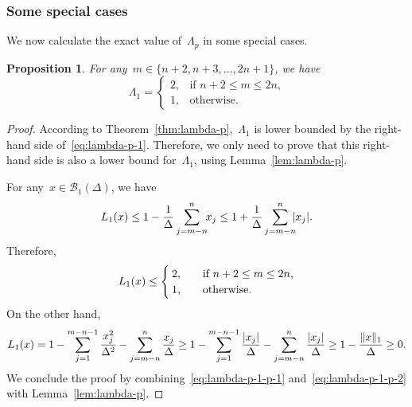 \documentclass{article}
\numberwithin{equation}{section}
\theoremstyle{definition}
\theoremstyle{plain}
\newtheorem{proposition}{Proposition}[section]
\theoremstyle{remark}
\newcommand*{\abs}[2][]{#1\lvert#2#1\rvert}
\newcommand*{\lagp}[1][]{L\ifblank{#1}{}{_{#1}}}
\newcommand*{\norm}[2][]{#1\lVert#2#1\rVert}
\newcommand*{\set}[2][]{#1\{#2#1\}}
\begin{document}
\subsubsection{Some special cases}

We now calculate the exact value of~$\Lambda_p$ in some special cases.

\begin{proposition}
    \label{prop:lambda-p-1}
    For any~$m \in \set{n + 2, n + 3, \dots, 2n + 1}$, we have
    \begin{equation}
        \label{eq:lambda-p-1}
        \Lambda_1 =
        \begin{cases}
            2,  & \text{if~$n + 2 \le m \le 2n$,}\\
            1,  & \text{otherwise.}
        \end{cases}
    \end{equation}
\end{proposition}

\begin{proof}
    According to Theorem~\ref{thm:lambda-p},~$\Lambda_1$ is lower bounded by the right-hand side of~\eqref{eq:lambda-p-1}.
    Therefore, we only need to prove that this right-hand side is also a lower bound for~$\Lambda_1$, using Lemma~\ref{lem:lambda-p}.

    For any~$x \in \mathcal{B}_1(\Delta)$, we have
    \begin{equation*}
        \lagp[1](x) \le 1 - \frac{1}{\Delta} \sum_{j = m - n}^n \!\! x_j \le 1 + \frac{1}{\Delta} \sum_{j = m - n}^n \!\! \abs{x_j}.
    \end{equation*}
    Therefore,
    \begin{equation}
        \label{eq:lambda-p-1-p-1}
        \lagp[1](x) \le
        \begin{cases}
            2,  & \quad \text{if~$n + 2 \le m \le 2n$,}\\
            1,  & \quad \text{otherwise.}
        \end{cases}
    \end{equation}
    On the other hand,
    \begin{equation}
        \label{eq:lambda-p-1-p-2}
        \lagp[1](x) = 1 - \sum_{j = 1}^{m - n - 1} \frac{x_j^2}{\Delta^2} - \sum_{j = m - n}^n \frac{x_j}{\Delta} \ge 1 - \sum_{j = 1}^{m - n - 1} \frac{\abs{x_j}}{\Delta} - \sum_{j = m - n}^n \frac{\abs{x_j}}{\Delta} \ge 1 - \frac{\norm{x}_1}{\Delta} \ge 0.
    \end{equation}
    We conclude the proof by combining~\eqref{eq:lambda-p-1-p-1} and~\eqref{eq:lambda-p-1-p-2} with Lemma~\ref{lem:lambda-p}.
\end{proof}
\end{document}
